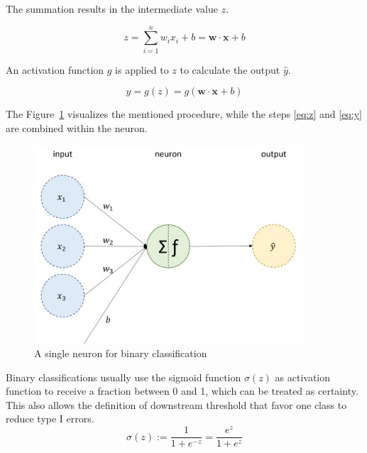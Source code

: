 The summation results in the intermediate value $z$.

\begin{equation} \label{eq:z}
    z = \sum_{i=1}^n w_i x_i + b = \mathbf{w} \cdot \mathbf{x} + b
\end{equation}

An activation function $g$ is applied to $z$ to calculate the output $\hat{y}$.

\begin{equation} \label{eq:y}
\hat{y} = g(z) = g(\mathbf{w} \cdot \mathbf{x} + b)
\end{equation}

The Figure~\ref{fig:neuron} visualizes the mentioned procedure, while the steps \ref{eq:z} and \ref{eq:y} are combined within the neuron.

\begin{figure}[H]
    \begin{center}
    \includegraphics[width=10cm]{../images/neuron.png}
    \caption{A single neuron for binary classification}\label{fig:neuron}
    \end{center}
\end{figure}

Binary classifications usually use the sigmoid function $\sigma(z)$ as activation function to receive a fraction between 0 and 1, which can be treated as certainty. This also allows the definition of downstream threshold that favor one class to reduce type I errors.
\begin{equation}
    \sigma(z) := \frac{1}{1+e^{-z}} = \frac{e^{z}}{1+e^{z}}
\end{equation}

